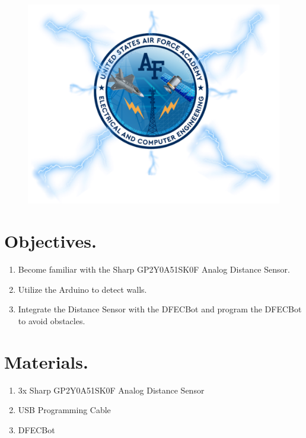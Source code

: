 \documentclass{handout}
\begin{document}
	\maketitle
			\begin{figure}[H]
		\centering
		\includegraphics[width=.75\textwidth]{Cover.PNG}
	\end{figure}
	
	\section{Objectives.} 
	\begin{enumerate}
		\item Become familiar with the Sharp GP2Y0A51SK0F Analog Distance Sensor.
		\item Utilize the Arduino to detect walls.
		\item Integrate the Distance Sensor with the DFECBot and program the DFECBot to avoid obstacles.
	\end{enumerate}
	
	\section{Materials.}
	\begin{enumerate}
		\item 3x Sharp GP2Y0A51SK0F Analog Distance Sensor
		\item USB Programming Cable
		\item DFECBot
	\end{enumerate}

	\newpage
\clearpage
\pagebreak
	
\end{document}
